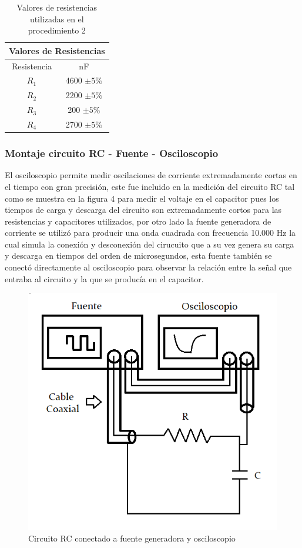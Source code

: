 \documentclass[10pt,letter]{article}
\begin{document}
\begin{multicols}{2}
\begin{table}[H]
\centering
\begin{tabular}{|c|c|}
\hline
\multicolumn{2}{|l|}{Valores de Resistencias} \\ \hline
Resistencia & nF \\ \hline
$R_1$ & 4600 $\pm 5\%$ \\ \hline
$R_2$ & 2200 $\pm 5\%$ \\ \hline
$R_3$ & 200 $\pm 5\%$ \\ \hline
$R_4$ & 2700 $\pm 5\%$ \\ \hline
\end{tabular}
\caption{Valores de resistencias utilizadas en el procedimiento 2}
\end{table}

\subsubsection{Montaje circuito RC - Fuente - Osciloscopio}

El osciloscopio permite medir oscilaciones de corriente extremadamente cortas en el tiempo con gran precisión, este fue incluido en la medición del circuito RC tal como se muestra en la figura 4 para medir el voltaje en el capacitor pues los tiempos de carga y descarga del circuito son extremadamente cortos para las resistencias y capacitores utilizados, por otro lado la fuente generadora de corriente se utilizó para producir una onda cuadrada con frecuencia 10.000 Hz la cual simula la conexión y desconexión del cirucuito que a su vez genera su carga y descarga en tiempos del orden de microsegundos, esta fuente también se conectó directamente al osciloscopio para observar la relación entre la señal que entraba al circuito y la que se producía en el capacitor.

\begin{figure}[H]
\centering
\includegraphics[scale=0.4]{Circuito}
\caption{Circuito RC conectado a fuente generadora y osciloscopio}
\label{RCcarga}
\end{figure}



\end{multicols}
\end{document}
